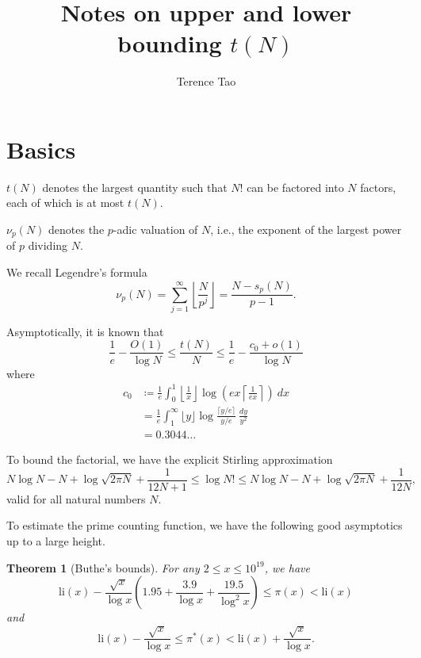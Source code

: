 \documentclass[12pt,a4paper,reqno]{amsart}
\numberwithin{equation}{section}
\theoremstyle{plain}
\newtheorem{theorem}{Theorem}[section]
\theoremstyle{definition}
\begin{document}
\title{Notes on upper and lower bounding $t(N)$}

\author{Terence Tao}
\maketitle


\section{Basics}

$t(N)$ denotes the largest quantity such that $N!$ can be factored into $N$ factors, each of which is at most $t(N)$.

$\nu_p(N)$ denotes the $p$-adic valuation of $N$, i.e., the exponent of the largest power of $p$ dividing $N$.

We recall Legendre's formula
\begin{equation}\label{legendre}
  \nu_p(N) = \sum_{j=1}^\infty \left\lfloor \frac{N}{p^j} \right\rfloor = \frac{N - s_p(N)}{p-1}.
\end{equation}

Asymptotically, it is known that
$$ \frac{1}{e} - \frac{O(1)}{\log N} \leq \frac{t(N)}{N} \leq \frac{1}{e} - \frac{c_0+o(1)}{\log N}$$
where
  \begin{align*}
    c_0 &\coloneqq \frac{1}{e} \int_0^1 \left \lfloor \frac{1}{x} \right\rfloor \log \left( ex \left \lceil \frac{1}{ex} \right\rceil \right)\ dx \\
    &= \frac{1}{e} \int_1^\infty \lfloor y \rfloor \log \frac{\lceil y/e \rceil}{y/e}\ \frac{dy}{y^2} \\
    &= 0.3044\dots
  \end{align*}

To bound the factorial, we have the explicit Stirling approximation \cite{robbins}
\begin{equation}\label{stirling}
  N \log N - N + \log \sqrt{2\pi N} + \frac{1}{12N+1} \leq \log N! \leq N \log N - N + \log \sqrt{2\pi N} + \frac{1}{12N},
\end{equation}
valid for all natural numbers $N$. 

To estimate the prime counting function, we have the following good asymptotics up to a large height.

  \begin{theorem}[Buthe's bounds]\cite{buthe}  For any $2 \leq x \leq 10^{19}$, we have
  $$ \mathrm{li}(x) - \frac{\sqrt{x}}{\log x}\left(1.95 + \frac{3.9}{\log x} + \frac{19.5}{\log^2 x}\right) \leq \pi(x) < \mathrm{li}(x)$$
  and
  $$ \mathrm{li}(x) - \frac{\sqrt{x}}{\log x} \leq \pi^*(x) < \mathrm{li}(x) + \frac{\sqrt{x}}{{\log x}}.$$
  \end{theorem}
  
\end{document}
